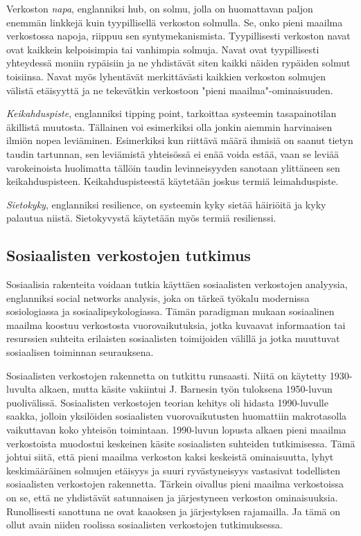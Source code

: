 \documentclass[finnish,12pt,a4paper,pdftex,elec,utf8]{aaltothesis}
\begin{document}
Verkoston \emph{napa}, englanniksi hub, on solmu, jolla on huomattavan paljon enemmän linkkejä kuin tyypillisellä verkoston solmulla. Se, onko pieni maailma verkostossa napoja, riippuu sen syntymekanismista. \cite[60]{Linkit} Tyypillisesti verkoston navat ovat kaikkein kelpoisimpia tai vanhimpia solmuja. Navat ovat tyypillisesti yhteydessä moniin rypäisiin ja ne yhdistävät siten kaikki näiden rypäiden solmut toisiinsa. Navat myös lyhentävät merkittävästi kaikkien verkoston solmujen välistä etäisyyttä ja ne tekevätkin verkostoon "pieni maailma"\space -ominaisuuden. \cite[68]{Linkit}

\emph{Keikahduspiste}, englanniksi tipping point, tarkoittaa systeemin tasapainotilan äkillistä muutosta. Tällainen voi esimerkiksi olla jonkin aiemmin harvinaisen ilmiön nopea leviäminen. Esimerkiksi kun riittävä määrä ihmisiä on saanut tietyn taudin tartunnan, sen leviämistä yhteisössä ei enää voida estää, vaan se leviää varokeinoista huolimatta tällöin taudin levinneisyyden sanotaan ylittäneen sen keikahduspisteen. Keikahduspisteestä käytetään joskus termiä leimahduspiste.

\emph{Sietokyky}, englanniksi resilience, on systeemin kyky sietää häiriöitä ja kyky palautua niistä. Sietokyvystä käytetään myös termiä resilienssi.

\subsection{Sosiaalisten verkostojen tutkimus}

Sosiaalisia rakenteita voidaan tutkia käyttäen sosiaalisten verkostojen analyysia, englanniksi social networks analysis, joka on tärkeä työkalu modernissa sosiologiassa ja sosiaalipsykologiassa. Tämän paradigman mukaan sosiaalinen maailma koostuu verkostosta vuorovaikutuksia, jotka kuvaavat informaation tai resurssien suhteita erilaisten sosiaalisten toimijoiden välillä ja jotka muuttuvat sosiaalisen toiminnan seurauksena. \cite{Social-network-analysis}

Sosiaalisten verkostojen rakennetta on tutkittu runsaasti. Niitä on käytetty 1930-luvulta alkaen, mutta käsite vakiintui J. Barnesin työn tuloksena 1950-luvun puolivälissä. Sosiaalisten verkostojen teorian kehitys oli hidasta 1990-luvulle saakka, jolloin yksilöiden sosiaalisten vuorovaikutusten huomattiin makrotasolla vaikuttavan koko yhteisön toimintaan. 1990-luvun lopusta alkaen pieni maailma verkostoista muodostui keskeinen käsite sosiaalisten suhteiden tutkimisessa. Tämä johtui siitä, että pieni maailma verkoston kaksi keskeistä ominaisuutta, lyhyt keskimääräinen solmujen etäisyys ja suuri ryvästyneisyys vastasivat todellisten sosiaalisten verkostojen rakennetta. Tärkein oivallus pieni maailma verkostoissa on se, että ne yhdistävät satunnaisen ja järjestyneen verkoston ominaisuuksia. \cite{Collective-dynamics} Runollisesti sanottuna ne ovat kaaoksen ja järjestyksen rajamailla. Ja tämä on ollut avain niiden roolissa sosiaalisten verkostojen tutkimuksessa.
\end{document}
